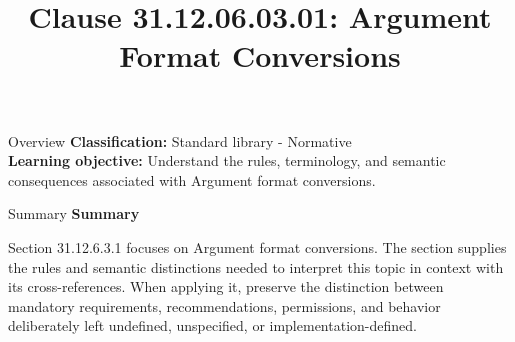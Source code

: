 \documentclass[10pt,letterpaper]{article}
\title{Clause 31.12.06.03.01: Argument Format Conversions}
\author{}
\date{}
\begin{document}
\maketitle
\begin{CornellOverviewBox}{Overview}
\textbf{Classification:} Standard library - Normative\\[2pt]
\textbf{Learning objective:} Understand the rules, terminology, and semantic consequences associated with Argument format conversions.
\end{CornellOverviewBox}\begin{CornellSummaryBox}{Summary}
{\sffamily\bfseries\color{Accent} Summary}\par\vspace{3pt}Section 31.12.6.3.1 focuses on Argument format conversions. The section supplies the rules and semantic distinctions needed to interpret this topic in context with its cross-references. When applying it, preserve the distinction between mandatory requirements, recommendations, permissions, and behavior deliberately left undefined, unspecified, or implementation-defined.
\end{CornellSummaryBox}
\end{document}
